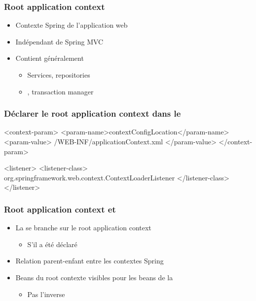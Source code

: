 \begin{frame}
 \frametitle{Root application context}
 
  \begin{itemize}
   \item Contexte Spring de l'application web
   \item Indépendant de Spring MVC
   \item Contient généralement
   \begin{itemize}
    \item Services, repositories
    \item {}, transaction manager
   \end{itemize}
  \end{itemize}
 
\end{frame}

\begin{frame}[fragile]
 \frametitle{Déclarer le root application context dans le }
  
 \begin{xmlcode}
<context-param>
  <param-name>contextConfigLocation</param-name>
  <param-value>
    /WEB-INF/applicationContext.xml
  </param-value>
</context-param>

<listener>
  <listener-class>
    org.springframework.web.context.ContextLoaderListener
  </listener-class>
</listener>
 \end{xmlcode}
 
\end{frame}

\begin{frame}
 \frametitle{Root application context et }
 
 \begin{itemize}
  \item La  se branche sur le root application context
  \begin{itemize}
   \item S'il a été déclaré
  \end{itemize}
  \item Relation parent-enfant entre les contextes Spring
  \item Beans du root contexte visibles pour les beans de la 
  \begin{itemize}
   \item Pas l'inverse
  \end{itemize}
 \end{itemize}
 
\end{frame}

